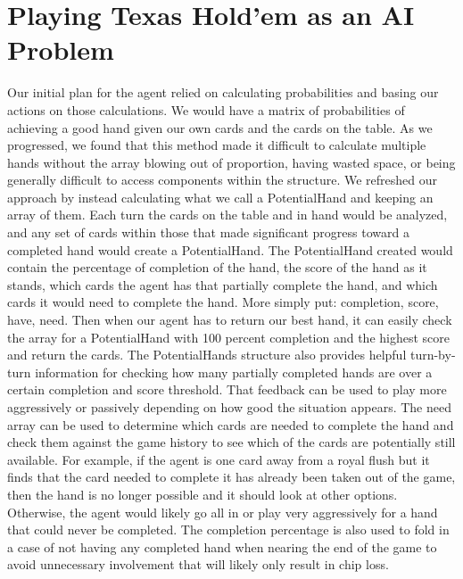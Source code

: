 \documentclass[10pt, a4paper, twocolumn]{article} %
\begin{document}

\section{Playing Texas Hold'em as an AI Problem}

Our initial plan for the agent relied on calculating probabilities and basing our actions on those calculations. We would have a matrix of probabilities of achieving a good hand given our own cards and the cards on the table. As we progressed, we found that this method made it difficult to calculate multiple hands without the array blowing out of proportion, having wasted space, or being generally difficult to access components within the structure. We refreshed our approach by instead calculating what we call a PotentialHand and keeping an array of them. Each turn the cards on the table and in hand would be analyzed, and any set of cards within those that made significant progress toward a completed hand would create a PotentialHand. The PotentialHand created would contain the percentage of completion of the hand, the score of the hand as it stands, which cards the agent has that partially complete the hand, and which cards it would need to complete the hand. More simply put: completion, score, have, need. Then when our agent has to return our best hand, it can easily check the array for a PotentialHand with 100 percent completion and the highest score and return the cards. The PotentialHands structure also provides helpful turn-by-turn information for checking how many partially completed hands are over a certain completion and score threshold. That feedback can be used to play more aggressively or passively depending on how good the situation appears. The need array can be used to determine which cards are needed to complete the hand and check them against the game history to see which of the cards are potentially still available. For example, if the agent is one card away from a royal flush but it finds that the card needed to complete it has already been taken out of the game, then the hand is no longer possible and it should look at other options. Otherwise, the agent would likely go all in or play very aggressively for a hand that could never be completed. The completion percentage is also used to fold in a case of not having any completed hand when nearing the end of the game to avoid unnecessary involvement that will likely only result in chip loss.
\end{document}
